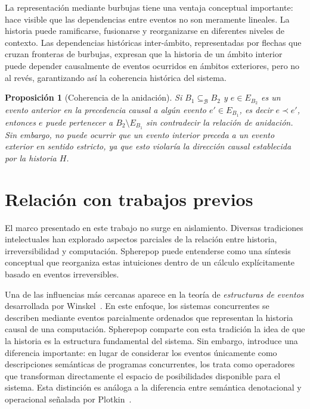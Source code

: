 \documentclass[12pt]{article}
\theoremstyle{plain}
\newtheorem{proposition}[theorem]{Proposición}
\theoremstyle{definition}
\begin{document}
La representación mediante burbujas tiene una ventaja conceptual importante: hace visible que las dependencias entre eventos no son meramente lineales. La historia puede ramificarse, fusionarse y reorganizarse en diferentes niveles de contexto. Las dependencias históricas inter-ámbito, representadas por flechas que cruzan fronteras de burbujas, expresan que la historia de un ámbito interior puede depender causalmente de eventos ocurridos en ámbitos exteriores, pero no al revés, garantizando así la coherencia histórica del sistema.

\begin{proposition}[Coherencia de la anidación]
\label{prop:coherencia}
Si $B_1 \subseteq_{\mathcal{B}} B_2$ y $e \in E_{B_2}$ es un evento anterior en la precedencia causal a algún evento $e' \in E_{B_1}$, es decir $e \prec e'$, entonces $e$ puede pertenecer a $B_2 \setminus E_{B_1}$ sin contradecir la relación de anidación. Sin embargo, no puede ocurrir que un evento interior preceda a un evento exterior en sentido estricto, ya que esto violaría la dirección causal establecida por la historia $H$.
\end{proposition}

\section{Relación con trabajos previos}
\label{sec:previo}

El marco presentado en este trabajo no surge en aislamiento. Diversas tradiciones intelectuales han explorado aspectos parciales de la relación entre historia, irreversibilidad y computación. Spherepop puede entenderse como una síntesis conceptual que reorganiza estas intuiciones dentro de un cálculo explícitamente basado en eventos irreversibles.

Una de las influencias más cercanas aparece en la teoría de \emph{estructuras de eventos} desarrollada por Winskel~\cite{winskel}. En este enfoque, los sistemas concurrentes se describen mediante eventos parcialmente ordenados que representan la historia causal de una computación. Spherepop comparte con esta tradición la idea de que la historia es la estructura fundamental del sistema. Sin embargo, introduce una diferencia importante: en lugar de considerar los eventos únicamente como descripciones semánticas de programas concurrentes, los trata como operadores que transforman directamente el espacio de posibilidades disponible para el sistema. Esta distinción es análoga a la diferencia entre semántica denotacional y operacional señalada por Plotkin~\cite{plotkin}.
\end{document}
